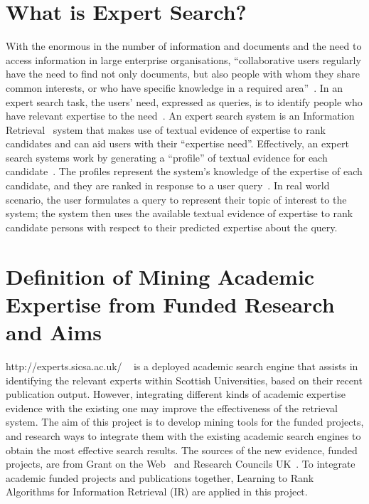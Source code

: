 \section{What is Expert Search?}\label{sec:expertsearch}
With the enormous in the number of information and documents and the need to access information in large enterprise organisations,
``collaborative users regularly have the need to find not only documents, but also people with whom they share common interests, 
or who have specific knowledge in a required area''~\cite[P. 388]{expertsearch}. In an expert search task,
the users' need, expressed as queries, is to identify people who have relevant expertise to the need~\cite[P. 387]{expertsearch}.
An expert search system is an Information Retrieval~\cite{IR} system that makes use of textual evidence 
of expertise to rank candidates and can aid users with their ``expertise need''. Effectively, an expert search systems work by generating a ``profile'' 
of textual evidence for each candidate~\cite[P. 388]{expertsearch}. The profiles represent the system's knowledge of the expertise of each 
candidate, and they are ranked in response to a user query~\cite[P. 388]{expertsearch}. In real world scenario, the user formulates a query to 
represent their topic of interest to the system; the system then uses the available textual evidence of expertise to rank candidate persons with 
respect to their predicted expertise about the query.

\section{Definition of Mining Academic Expertise from Funded Research and Aims}\label{section:aims}
http://experts.sicsa.ac.uk/ ~\cite{sicsasearch} is a deployed academic search engine that assists in identifying the relevant experts within Scottish Universities, 
based on their recent publication output. However, integrating different kinds of academic expertise evidence with the existing one may improve
the effectiveness of the retrieval system. The aim of this project is to develop mining tools for the funded projects, 
and research ways to integrate them with the existing academic search engines to obtain the most effective search results. 
The sources of the new evidence, funded projects, are from Grant on the Web~\cite{gow} and Research Councils UK~\cite{gtr}.
To integrate academic funded projects and publications together, Learning to Rank Algorithms for Information Retrieval (IR) are applied in this project.

